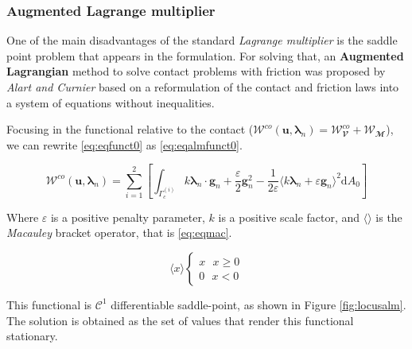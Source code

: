 \documentclass[a4paper,10pt]{article} %
\begin{document}
\subsubsection{Augmented Lagrange multiplier}

One of the main disadvantages of the standard \textit{Lagrange multiplier} is the saddle point problem that appears in the formulation. For solving that, an \textbf{Augmented Lagrangian} method to solve contact problems with friction was proposed by \textit{Alart and Curnier}\cite{alart} based on a reformulation of the contact and friction laws into a system
of equations without inequalities. 

Focusing in the functional relative to the contact ($\mathcal{W}^{co}(\mathbf{u},\boldsymbol{\lambda}_n) = \mathcal{W}^{co}_\mathbfcal{V} + \mathcal{W}_\mathbfcal{M}$), we can rewrite \eqref{eq:eqfunct0} as \eqref{eq:eqalmfunct0}.

\begin{equation}\label{eq:eqalmfunct0}
 \mathcal{W}^{co}(\mathbf{u},\boldsymbol{\lambda}_n) = \sum_{i = 1}^2 \left[\int_{\Gamma_c^{(i)}} k \boldsymbol{\lambda}_n \cdot \mathbf{g}_n  + \frac{\varepsilon}{2} \mathbf{g}_n^2 - \frac{1}{2\varepsilon} \langle k \boldsymbol{\lambda}_n + \varepsilon \mathbf{g}_n \rangle^2\text{d}A_0\right]
\end{equation}

Where $\varepsilon$ is a positive penalty parameter, $k$ is a positive scale factor, and $\langle \rangle$ is the \textit{Macauley} bracket operator, that is \eqref{eq:eqmac}.

\begin{equation}\label{eq:eqmac}
 \langle x \rangle \begin{cases} x \text{ } x \geq 0\\ 0 \text{ } x < 0 \end{cases}
\end{equation}

This functional is $\mathcal{C}^1$ differentiable saddle-point, as shown in Figure \ref{fig:locusalm}. The solution is obtained as the set of values that render this functional stationary. 
\end{document}
